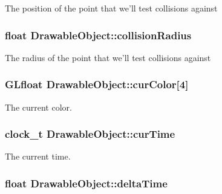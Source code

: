 The position of the point that we'll test collisions against \hypertarget{class_drawable_object_a69b3952eaeae380114be118198908fdf}{
\subsubsection[{collision\-Radius}]{\setlength{\rightskip}{0pt plus 5cm}float {\bf Drawable\-Object\-::collision\-Radius}}}\label{class_drawable_object_a69b3952eaeae380114be118198908fdf}
The radius of the point that we'll test collisions against \hypertarget{class_drawable_object_a53a37ba10a56302e75fdd5a77985ae43}{
\subsubsection[{cur\-Color}]{\setlength{\rightskip}{0pt plus 5cm}G\-Lfloat {\bf Drawable\-Object\-::cur\-Color}\mbox{[}4\mbox{]}}}\label{class_drawable_object_a53a37ba10a56302e75fdd5a77985ae43}
The current color. \hypertarget{class_drawable_object_abbd6a912f2bdc24bcb2ae342cb016c08}{
\subsubsection[{cur\-Time}]{\setlength{\rightskip}{0pt plus 5cm}clock\-\_\-t {\bf Drawable\-Object\-::cur\-Time}}}\label{class_drawable_object_abbd6a912f2bdc24bcb2ae342cb016c08}
The current time. \hypertarget{class_drawable_object_a590806d20dcd8f7e1422075b2f147cb6}{
\subsubsection[{delta\-Time}]{\setlength{\rightskip}{0pt plus 5cm}float {\bf Drawable\-Object\-::delta\-Time}}}\label{class_drawable_object_a590806d20dcd8f7e1422075b2f147cb6}
